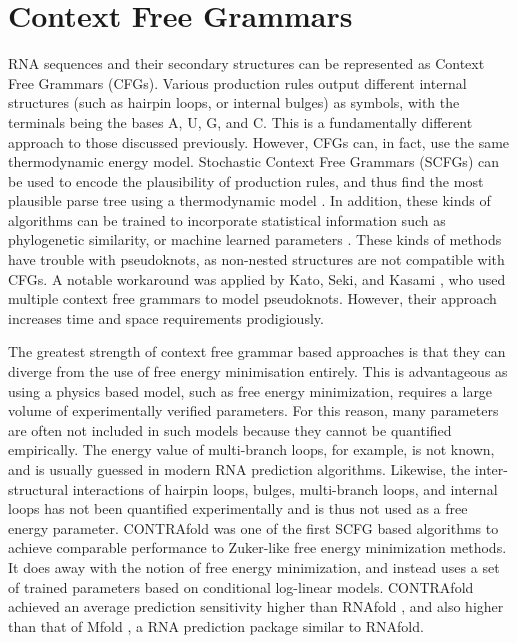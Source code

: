 \documentclass{cshonours}
\begin{document}
\section{Context Free Grammars}
RNA sequences and their secondary structures can be represented as Context Free
Grammars (CFGs). Various production rules output different internal structures (such as
hairpin loops, or internal bulges) as symbols, with the terminals being the bases A, U, G,
and C. This is a fundamentally different approach to those discussed previously. However, CFGs can, in fact, use the same thermodynamic energy model. Stochastic Context Free Grammars (SCFGs) can be used to encode the plausibility of
production rules, and thus find the most plausible parse tree using a thermodynamic model \cite{rivas2012range}. In addition, these kinds of algorithms can be trained to
incorporate statistical information such as phylogenetic similarity, or machine
learned parameters \cite{rivas2012range}. These kinds of methods have trouble with pseudoknots, as non-nested structures are not compatible with CFGs.
A notable workaround was applied by Kato, Seki, and Kasami \cite{kato2006stochastic}, who used
multiple context free grammars to model pseudoknots. However, their approach
increases time and space requirements prodigiously.


The greatest strength of context free grammar based approaches is that they
can diverge from the use of free energy minimisation entirely. This is advantageous as using
a physics based model, such as free energy minimization, requires a large volume
of experimentally verified parameters. For this reason, many parameters are often not included in such models because they cannot be quantified empirically.
The energy value of multi-branch loops, for example, is not known, and is usually
guessed in modern RNA prediction algorithms. Likewise, the inter-structural
interactions of hairpin loops, bulges, multi-branch loops, and internal loops has
not been quantified experimentally and is thus not used as a free energy parameter. CONTRAfold \cite{do2006contrafold} was one of the first SCFG based algorithms to achieve
comparable performance to Zuker-like free energy minimization methods. It does
away with the notion of free energy minimization, and instead uses a
set of trained parameters based on conditional log-linear models. CONTRAfold
achieved an average prediction sensitivity higher than RNAfold \cite{lorenz2011viennarna}, and also higher
than that of Mfold \cite{zuker2003mfold}, a RNA prediction package similar to RNAfold.
\end{document}
